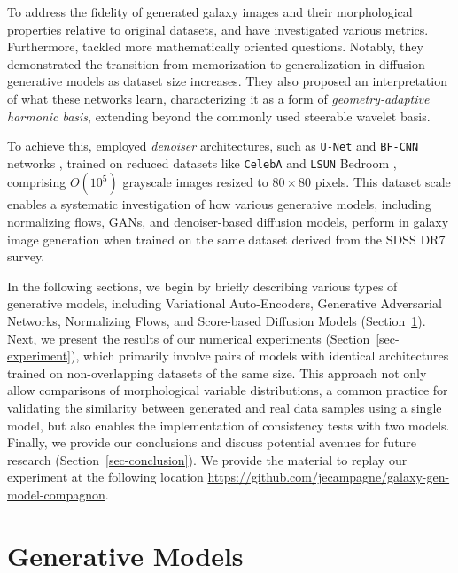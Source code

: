 \documentclass[fleqn,usenatbib]{mnras}
\begin{document}
To address the fidelity of generated galaxy images and their morphological properties relative to original datasets, \cite{HACKSTEIN2023100685} and \cite{janulewicz2024assessing} have investigated various metrics. Furthermore, \cite{kadkhodaie2024generalization} tackled more mathematically oriented questions. Notably, they demonstrated the transition from memorization to generalization in diffusion generative models as dataset size increases. They also proposed an interpretation of what these networks learn, characterizing it as a form of \textit{geometry-adaptive harmonic basis}, extending beyond the commonly used {steerable wavelet basis}. 

To achieve this, \cite{kadkhodaie2024generalization} employed \textit{denoiser} architectures, such as \texttt{U-Net} \citep{ronneberger2015u} and \texttt{BF-CNN} networks \citep{Mohan2020Robust}, trained on reduced datasets like \texttt{CelebA} \citep{Liu2015} and \texttt{LSUN} Bedroom \citep{Yu2015}, comprising $O(10^5)$ grayscale images resized to $80 \times 80$ pixels.  This dataset scale enables a systematic investigation of how various generative models, including normalizing flows, GANs, and denoiser-based diffusion models, perform in galaxy image generation when trained on the same dataset derived from the SDSS DR7 survey. 

In the following sections, we begin by briefly describing various types of generative models, including Variational Auto-Encoders, Generative Adversarial Networks, Normalizing Flows, and Score-based Diffusion Models (Section~\ref{sec-generative-models}). Next, we present the results of our numerical experiments (Section~\ref{sec-experiment}), which primarily involve pairs of models with identical architectures trained on non-overlapping datasets of the same size. This approach not only allow comparisons of morphological variable distributions, a common practice for validating the similarity between generated and real data samples using a single model, but also enables the implementation of consistency tests with two models. Finally, we provide our conclusions and discuss potential avenues for future research (Section~\ref{sec-conclusion}). We provide the material to replay our experiment at the following location \url{https://github.com/jecampagne/galaxy-gen-model-compagnon}.
%
\section{Generative Models}
\label{sec-generative-models}
\end{document}
